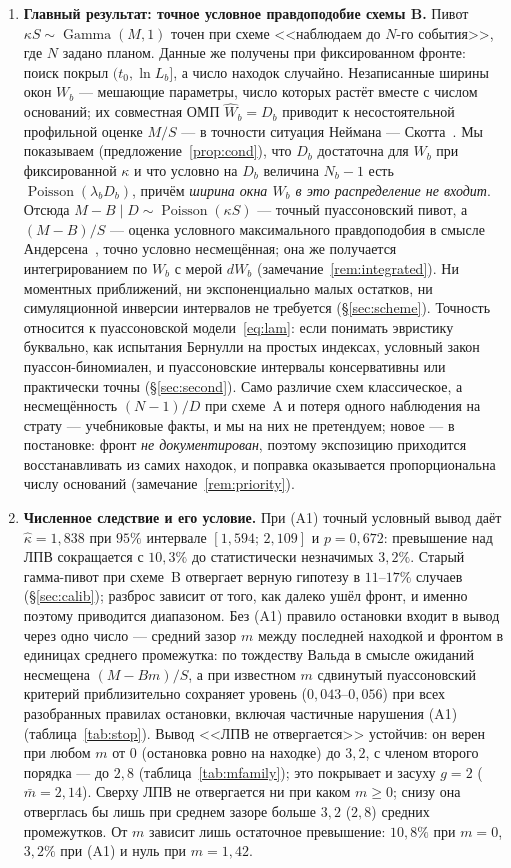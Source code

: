 \documentclass[11pt,a4paper]{article}
\theoremstyle{plain}
\theoremstyle{remark}
\DeclareMathOperator{\Gam}{Gamma}
\DeclareMathOperator{\Pois}{Poisson}
\begin{document}
\begin{enumerate}
\item\textbf{Главный результат: точное условное правдоподобие схемы B.} Пивот
$\kappa S\sim\Gam(M,1)$ точен при схеме <<наблюдаем до $N$-го события>>, где $N$
задано планом. Данные же получены при фиксированном фронте: поиск покрыл
$(t_0,\ln L_b]$, а число находок случайно. Незаписанные ширины окон $W_b$ ---
мешающие параметры, число которых растёт вместе с числом оснований; их
совместная ОМП $\hat W_b=D_b$ приводит к несостоятельной профильной оценке
$M/S$ --- в точности ситуация Неймана --- Скотта~\cite{neymanscott1948}. Мы
показываем (предложение~\ref{prop:cond}), что $D_b$ достаточна для $W_b$ при
фиксированной $\kappa$ и что условно на $D_b$ величина $N_b-1$ есть
$\Pois(\lambda_bD_b)$, причём \emph{ширина окна $W_b$ в это распределение не
входит}. Отсюда $M-B\mid D\sim\Pois(\kappa S)$ --- точный пуассоновский пивот,
а $(M-B)/S$ --- оценка условного максимального правдоподобия в смысле
Андерсена~\cite{andersen1970}, точно условно несмещённая; она же получается
интегрированием по $W_b$ с мерой $dW_b$ (замечание~\ref{rem:integrated}). Ни моментных
приближений, ни экспоненциально малых остатков, ни симуляционной инверсии
интервалов не требуется (\S\ref{sec:scheme}). Точность относится к пуассоновской
модели~\eqref{eq:lam}: если понимать эвристику буквально, как испытания Бернулли
на простых индексах, условный закон пуассон-биномиален, и пуассоновские интервалы
консервативны или практически точны (\S\ref{sec:second}). Само различие схем классическое, а
несмещённость $(N-1)/D$ при схеме~A и потеря одного наблюдения на страту ---
учебниковые факты, и мы на них не претендуем; новое --- в постановке: фронт
\emph{не документирован}, поэтому экспозицию приходится восстанавливать из самих
находок, и поправка оказывается пропорциональна числу оснований
(замечание~\ref{rem:priority}).

\item\textbf{Численное следствие и его условие.} При (A1) точный условный вывод
даёт $\hat\kappa=1{,}838$ при $95\%$ интервале $[1{,}594;\,2{,}109]$ и $p=0{,}672$:
превышение над ЛПВ сокращается с $10{,}3\%$ до статистически незначимых $3{,}2\%$.
Старый гамма-пивот при схеме~B отвергает верную
гипотезу в $11$--$17\%$ случаев (\S\ref{sec:calib}); разброс зависит от того, как
далеко ушёл фронт, и именно поэтому приводится диапазоном. Без (A1) правило
остановки входит в вывод через одно число --- средний зазор $m$ между последней
находкой и фронтом в единицах среднего промежутка: по тождеству Вальда в смысле
ожиданий несмещена $(M-Bm)/S$, а при известном $m$ сдвинутый пуассоновский
критерий приблизительно сохраняет уровень ($0{,}043$--$0{,}056$) при всех
разобранных правилах остановки, включая частичные нарушения (A1)
(таблица~\ref{tab:stop}). Вывод <<ЛПВ не отвергается>> устойчив: он верен при любом
$m$ от $0$ (остановка ровно на находке) до $3{,}2$, с членом второго порядка --- до
$2{,}8$ (таблица~\ref{tab:mfamily}); это покрывает и засуху $g=2$
($\bar m=2{,}14$). Сверху ЛПВ не отвергается ни при каком
$m\ge0$; снизу она отверглась бы лишь при среднем зазоре больше $3{,}2$ ($2{,}8$)
средних промежутков. От
$m$ зависит лишь остаточное превышение: $10{,}8\%$ при $m=0$, $3{,}2\%$ при (A1) и
нуль при $m=1{,}42$.


\end{enumerate}
\end{document}
